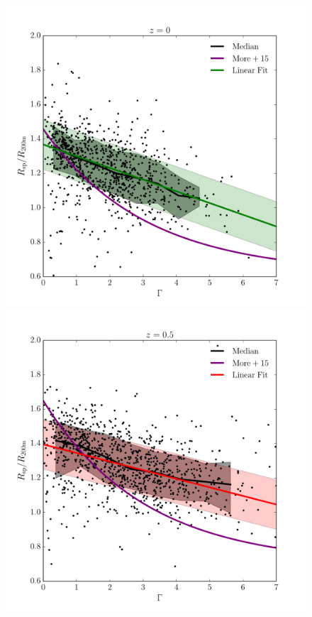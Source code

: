 \documentclass[numberedappendix,apj]{emulateapj}
\begin{document}
\begin{figure}
   \centering
   \includegraphics[width=\columnwidth]{z0_fit.pdf}
   \includegraphics[width=\columnwidth]{z05_fit.pdf}\\

\end{figure}
\end{document}
